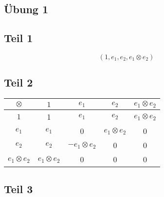 \documentclass[10pt,a4paper]{article}
\begin{document}
\subsection*{Übung 1}

\subsection*{Teil 1}

\begin{equation}
(1, e_{1}, e_{2}, e_{1} \otimes e_{2})
\end{equation}

\subsection*{Teil 2}

\begin{tabular}{c|c|c|c|c}
$\otimes$ & $1$ & $e_{1}$ & $e_{2}$ & $e_{1} \otimes e_{2}$\\
\hline
$1$ & 1 & $e_{1}$ & $e_{2}$ & $e_{1} \otimes e_{2}$\\
\hline
$e_{1}$ & $e_{1}$ & 0 & $e_{1} \otimes e_{2}$ & 0\\
\hline
$e_{2}$ & $e_{2}$ & $-e_{1} \otimes e_{2}$ & 0 & 0\\
\hline
$e_{1} \otimes e_{2}$ & $e_{1} \otimes e_{2}$ & 0 & 0 & 0
\end{tabular}

\subsection*{Teil 3}
\end{document}
